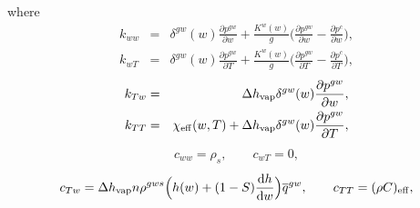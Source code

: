 where
\begin{eqnarray}
 k_{ww} &=& \delta^{gw}(w)\frac{\partial p^{gw}}{\partial w} + \frac{K^w(w)}{g}\Big(\frac{\partial p^{gw}}{\partial w} - \frac{\partial p^{c}}{\partial w}\Big),\\
 k_{wT} &=& \delta^{gw}(w)\frac{\partial p^{gw}}{\partial T} + \frac{K^w(w)}{g}\Big(\frac{\partial p^{gw}}{\partial T} - \frac{\partial p^{c}}{\partial T}\Big),
\end{eqnarray}
\begin{eqnarray}
 k_{Tw} &=& \Delta h_{\rm vap} \delta^{gw}(w) \frac{\partial p^{gw}}{\partial w},\\
 k_{TT} &=& \chi_{\rm eff} (w,T) +  \Delta h_{\rm vap} \delta^{gw}(w) \frac{\partial p^{gw}}{\partial T},
\end{eqnarray}
\begin{eqnarray}
 c_{ww} = \rho_s,
\qquad c_{wT} = 0,
\end{eqnarray}
\begin{eqnarray}
 c_{Tw} = \Delta h_{\rm vap} n \rho^{gws} \Big( h(w) + (1-S)\frac{{\rm d} h}{{\rm d} w}\Big)\overline{q}^{gw} ,
\qquad c_{TT} = (\rho C)_{\rm eff},
\end{eqnarray}
